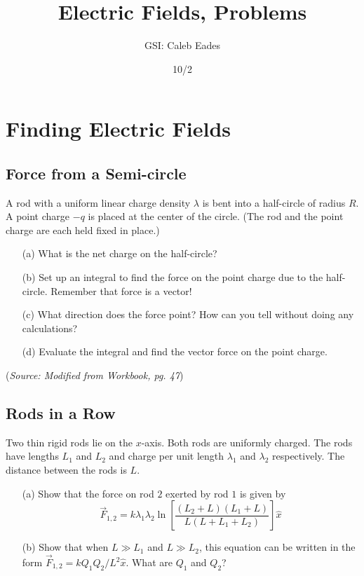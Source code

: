\documentclass{article}
\begin{document}
\title{Electric Fields, Problems}
\author{GSI: Caleb Eades}
\date{10/2}
\maketitle

\section{Finding Electric Fields}

\subsection{Force from a Semi-circle}

A rod with a uniform linear charge density $\lambda$ is bent into a half-circle of radius $R$. A point charge $-q$ is placed at the center of the circle. (The rod and the point charge are each held fixed in place.)
\begin{itemize}
	\item[(a)] What is the net charge on the half-circle?
	\item[(b)] Set up an integral to find the force on the point charge due to the half-circle. Remember that force is a vector!
	\item[(c)] What direction does the force point? How can you tell without doing any calculations?
	\item[(d)] Evaluate the integral and find the vector force on the point charge.
\end{itemize}

(\textit{Source: Modified from Workbook, pg. 47})

\subsection{Rods in a Row}

Two thin rigid rods lie on the $x$-axis. Both rods are uniformly charged. The rods have lengths $L_1$ and $L_2$ and charge per unit length $\lambda_1$ and $\lambda_2$ respectively. The distance between the rods is $L$.
\begin{itemize}
	\item[(a)] Show that the force on rod $2$ exerted by rod $1$ is given by
	\begin{equation}
	\vec{F}_{1,2} = k \lambda_1 \lambda_2 \ln\left[ \frac{(L_2 + L)(L_1 + L)}{L(L+L_1+L_2)} \right]\hat{x}
	\end{equation}
	\item[(b)] Show that when $L \gg L_1$ and $L \gg L_2$, this equation can be written in the form
	$\vec{F}_{1,2} = k Q_1 Q_2 / L^2\hat{x}$.
	What are $Q_1$ and $Q_2$?
\end{itemize}
\end{document}
